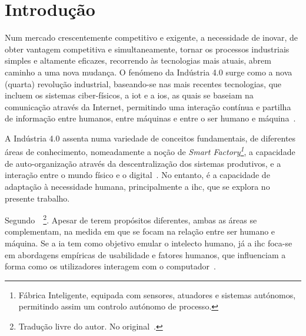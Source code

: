 \chapter{Introdução}
\label{chap:Chapter1}
Num mercado crescentemente competitivo e exigente, a necessidade de inovar, de obter vantagem competitiva e simultaneamente, tornar os processos industriais simples e altamente eficazes, recorrendo às tecnologias mais atuais, abrem caminho a uma nova mudança. O fenómeno da Indústria 4.0 surge como a nova (quarta) revolução industrial, baseando-se nas mais recentes tecnologias, que incluem os sistemas ciber-físicos, a \gls{iot} e a \gls{ios}, as quais se baseiam na comunicação através da Internet, permitindo uma interação contínua e partilha de informação entre humanos, entre máquinas e entre o ser humano e máquina~\parencite{complex_view_industry40}. 

A Indústria 4.0 assenta numa variedade de conceitos fundamentais, de diferentes áreas de conhecimento, nomeadamente a noção de \textit{Smart Factory\footnote{Fábrica Inteligente, equipada com sensores, atuadores e sistemas autónomos, permitindo assim um controlo autónomo de processo.}}, a capacidade de auto-organização através da descentralização dos sistemas produtivos, e a interação entre o mundo físico e o digital~\parencite[Fundamental Concepts, p.240]{industry40}. No entanto, é a capacidade de adaptação à necessidade humana, principalmente a \gls{ihc}, que se explora no presente trabalho.

Segundo~\textcite[p.1]{natural_language_translation_intersaction_ai_hci}~\footnote{Tradução livre do autor. No original~.}. Apesar de terem propósitos diferentes, ambas as áreas se complementam, na medida em que se focam na relação entre ser humano e máquina. Se a \gls{ia} tem como objetivo emular o intelecto humano, já a \gls{ihc} foca-se em abordagens empíricas de usabilidade e fatores humanos, que influenciam a forma como os utilizadores interagem com o computador~\parencite{natural_language_translation_intersaction_ai_hci}. 

